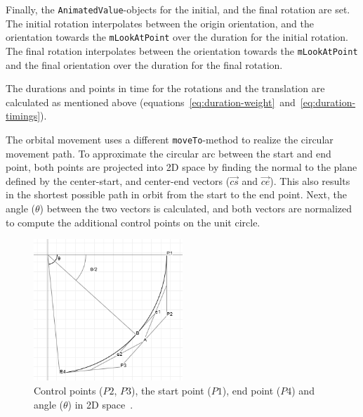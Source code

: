 Finally, the \texttt{AnimatedValue}-objects for the initial, and the final rotation are set.
The initial rotation interpolates between the origin orientation, and the orientation towards the
\texttt{mLookAtPoint} over the duration for the initial rotation.
The final rotation interpolates between the orientation towards the \texttt{mLookAtPoint} and the final
orientation over the duration for the final rotation.

The durations and points in time for the rotations and the translation are calculated as mentioned above
(equations~\ref{eq:duration-weight}~and~\ref{eq:duration-timings}).

The orbital movement uses a different \texttt{moveTo}-method to realize the circular movement path.
To approximate the circular arc between the start and end point, both points are projected into 2D space by finding
the normal to the plane defined by the center-start, and center-end vectors ($\overrightarrow{cs}$ and
$\overrightarrow{ce}$).
This also results in the shortest possible path in orbit from the start to the end point.
Next, the angle ($\theta$) between the two vectors is calculated, and both vectors are normalized to compute the
additional control points on the unit circle.

\begin{figure}[h]
    \centering
    \includegraphics[width=0.5\textwidth]{content/4_3_autoNavigation/img/CircularCurveParameters}
    \caption{Control points ($P2$, $P3$), the start point ($P1$), end point ($P4$) and angle ($\theta$) in 2D
    space~\cite{Poxmax2021}.}
    \label{fig:orbital-control-points}
\end{figure}

